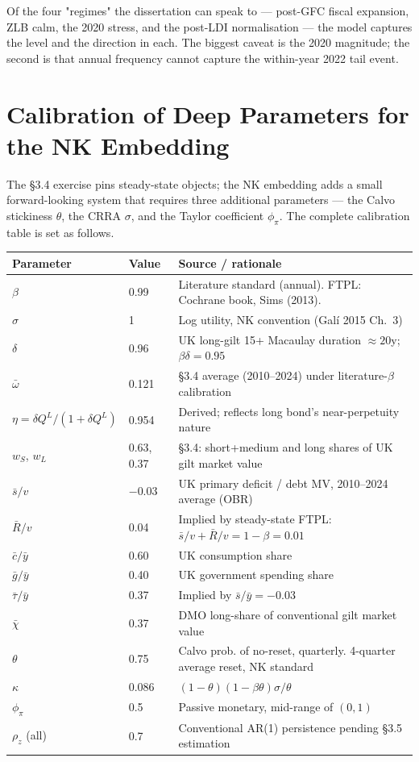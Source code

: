 \documentclass[11pt,a4paper]{article}
\begin{document}
Of the four "regimes" the dissertation can speak to --- post-GFC fiscal expansion, ZLB calm, the 2020 stress, and the post-LDI normalisation --- the model captures the level and the direction in each. The biggest caveat is the 2020 magnitude; the second is that annual frequency cannot capture the within-year 2022 tail event.

\section{Calibration of Deep Parameters for the NK Embedding}

The §3.4 exercise pins steady-state objects; the NK embedding adds a small forward-looking system that requires three additional parameters --- the Calvo stickiness $\theta$, the CRRA $\sigma$, and the Taylor coefficient $\phi_\pi$. The complete calibration table is set as follows.

\begin{center}
\begin{tabular}{l l l}
\toprule
Parameter & Value & Source / rationale \\
\midrule
$\beta$              & 0.99    & Literature standard (annual). FTPL: Cochrane book, Sims (2013).  \\
$\sigma$             & 1       & Log utility, NK convention (Gal\'i 2015 Ch.\ 3) \\
$\delta$             & 0.96    & UK long-gilt 15+ Macaulay duration $\approx 20$y; $\beta\delta=0.95$ \\
$\bar\omega$         & 0.121   & §3.4 average (2010--2024) under literature-$\beta$ calibration \\
$\eta = \delta Q^L/(1+\delta Q^L)$ & 0.954 & Derived; reflects long bond's near-perpetuity nature \\
$w_S$, $w_L$         & 0.63, 0.37 & §3.4: short+medium and long shares of UK gilt market value \\
$\bar s / v$         & $-0.03$ & UK primary deficit / debt MV, 2010--2024 average (OBR) \\
$\bar R / v$         & 0.04    & Implied by steady-state FTPL: $\bar s/v + \bar R/v = 1-\beta = 0.01$ \\
$\bar c/\bar y$      & 0.60    & UK consumption share \\
$\bar g/\bar y$      & 0.40    & UK government spending share \\
$\bar\tau/\bar y$    & 0.37    & Implied by $\bar s/\bar y = -0.03$ \\
$\bar\chi$           & 0.37    & DMO long-share of conventional gilt market value \\
$\theta$             & 0.75    & Calvo prob. of no-reset, quarterly. 4-quarter average reset, NK standard \\
$\kappa$             & 0.086   & $(1-\theta)(1-\beta\theta)\sigma/\theta$ \\
$\phi_\pi$           & 0.5     & Passive monetary, mid-range of $(0,1)$ \\
$\rho_z$ (all)       & 0.7     & Conventional AR(1) persistence pending §3.5 estimation \\
\bottomrule
\end{tabular}
\end{center}
\end{document}
